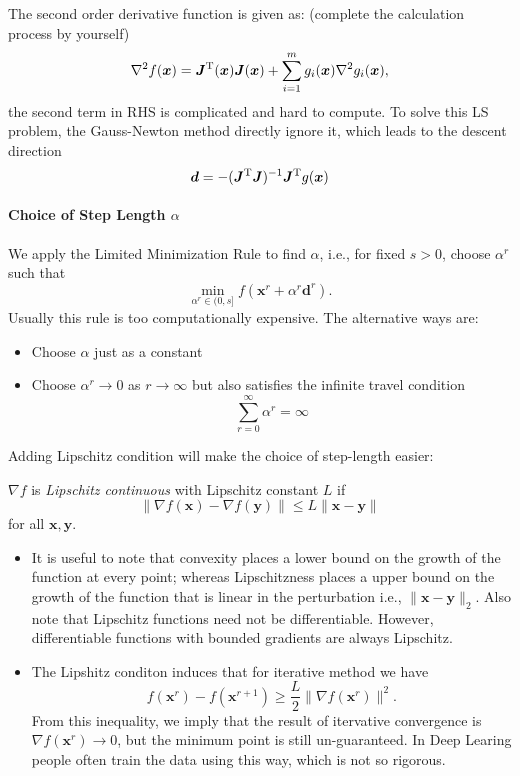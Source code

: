 The second order derivative function is given as: (complete the calculation process by yourself)
\[
\nabla^2 f(\bm x) = \bm J^{\mathrm T}(\bm x)\bm J(\bm x)+\sum_{i=1}^mg_i(\bm x)\nabla^2 g_i(\bm x),
\]
the second term in RHS is complicated and hard to compute. To solve this LS problem, the Gauss-Newton method directly ignore it, which leads to the descent direction
\[
\bm d = -(\bm J^{\mathrm T}\bm J)^{-1}\bm J^{\mathrm T} g(\bm x)
\]
\paragraph{Choice of Step Length $\alpha$}
We apply the Limited Minimization Rule to find $\alpha$, i.e., for fixed $s>0$, choose $\alpha^r$ such that
\[
\min_{\alpha^r\in(0,s]}f(\bm x^r+\alpha^r\bm d^r).
\]
Usually this rule is too computationally expensive. The alternative ways are:
\begin{itemize}
\item
Choose $\alpha$ just as a constant
\item
Choose $\alpha^r\to0$ as $r\to\infty$ but also satisfies the infinite travel condition
\[
\sum_{r=0}^\infty\alpha^r=\infty
\]
\end{itemize}
Adding Lipschitz condition will make the choice of step-length easier:
\begin{definition}
$\nabla f$ is \emph{Lipschitz continuous} with Lipschitz constant $L$ if
\[
\|\nabla f(\bm x) - \nabla f(\bm y)\|\le L\|\bm x-\bm y\|
\]
for all $\bm x,\bm y$.
\end{definition}
\begin{remark}
\begin{itemize}
\item
It is useful to note that convexity places a lower bound on the growth of the function at every point; whereas Lipschitzness places a upper bound on the growth of the function that is linear in the perturbation i.e., $\|\bm x-\bm y\|_2$. Also note that Lipschitz functions need not be differentiable. However, differentiable functions with bounded gradients are always Lipschitz.
\item
The Lipshitz conditon induces that for iterative method we have
\[
f(\bm x^r) - f(\bm x^{r+1})\ge\frac{L}{2}\|\nabla f(\bm x^r)\|^2.
\]
From this inequality, we imply that the result of itervative convergence is $\nabla f(\bm x^r)\to0$, but the minimum point is still un-guaranteed. In Deep Learing people often train the data using this way, which is not so rigorous.
\end{itemize}

\end{remark}

